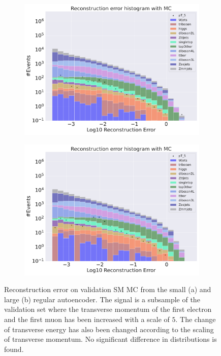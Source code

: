 \begin{figure}[H]
    \centering
    \begin{subfigure}{.45\textwidth}
        \includegraphics[width=\textwidth]{Figures/AE_testing/small/b_data_recon_big_rm3_feats_sig_pT_5.pdf}
        \caption{ }
        \label{fig:ae_small_pt_5}
    \end{subfigure}
    \hfill 
    \begin{subfigure}{.45\textwidth}
        \includegraphics[width=\textwidth]{Figures/AE_testing/big/b_data_recon_big_rm3_feats_sig_pT_5.pdf}
        \caption{}
        \label{fig:ae_big_pt_5}
    \end{subfigure}
    \hfill 
    \caption[AE | Reconstruction error $p_T$ altering of 5]{Reconstruction error on validation SM MC from the small (a) and large (b) regular autoencoder. The signal is a subsample of the validation 
    set where the transverse momentum of the first electron and the first muon has been increased with a scale of $5$. The change of transverse 
    energy has also been changed according to the scaling of transverse momentum. No significant difference in distributions is found. }
    \label{fig:ae_big_small_pt_5}
\end{figure}



